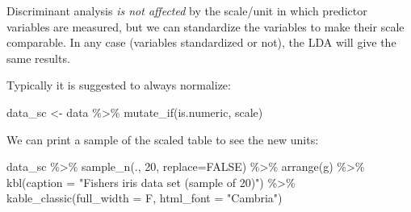 \documentclass[
]{article}
\newenvironment{Shaded}{\begin{snugshade}}{\end{snugshade}}
\newcommand{\AttributeTok}[1]{\textcolor[rgb]{0.77,0.63,0.00}{#1}}
\newcommand{\ConstantTok}[1]{\textcolor[rgb]{0.00,0.00,0.00}{#1}}
\newcommand{\DecValTok}[1]{\textcolor[rgb]{0.00,0.00,0.81}{#1}}
\newcommand{\FunctionTok}[1]{\textcolor[rgb]{0.00,0.00,0.00}{#1}}
\newcommand{\NormalTok}[1]{#1}
\newcommand{\OtherTok}[1]{\textcolor[rgb]{0.56,0.35,0.01}{#1}}
\newcommand{\SpecialCharTok}[1]{\textcolor[rgb]{0.00,0.00,0.00}{#1}}
\newcommand{\StringTok}[1]{\textcolor[rgb]{0.31,0.60,0.02}{#1}}
\begin{document}
Discriminant analysis \emph{is not affected} by the scale/unit in which
predictor variables are measured, but we can standardize the variables
to make their scale comparable. In any case (variables standardized or
not), the LDA will give the same results.

Typically it is suggested to always normalize:

\begin{Shaded}
\begin{Highlighting}[]
\NormalTok{data\_sc }\OtherTok{\textless{}{-}}\NormalTok{ data }\SpecialCharTok{\%\textgreater{}\%}
        \FunctionTok{mutate\_if}\NormalTok{(is.numeric, scale)}
\end{Highlighting}
\end{Shaded}

We can print a sample of the scaled table to see the new units:

\begin{Shaded}
\begin{Highlighting}[]
\NormalTok{data\_sc }\SpecialCharTok{\%\textgreater{}\%}
  \FunctionTok{sample\_n}\NormalTok{(., }\DecValTok{20}\NormalTok{, }\AttributeTok{replace=}\ConstantTok{FALSE}\NormalTok{) }\SpecialCharTok{\%\textgreater{}\%} 
  \FunctionTok{arrange}\NormalTok{(g) }\SpecialCharTok{\%\textgreater{}\%} 
  \FunctionTok{kbl}\NormalTok{(}\AttributeTok{caption =} \StringTok{"Fisher\textquotesingle{}s iris data set (sample of 20)"}\NormalTok{) }\SpecialCharTok{\%\textgreater{}\%}
  \FunctionTok{kable\_classic}\NormalTok{(}\AttributeTok{full\_width =}\NormalTok{ F, }\AttributeTok{html\_font =} \StringTok{"Cambria"}\NormalTok{)}
\end{Highlighting}
\end{Shaded}
\end{document}
